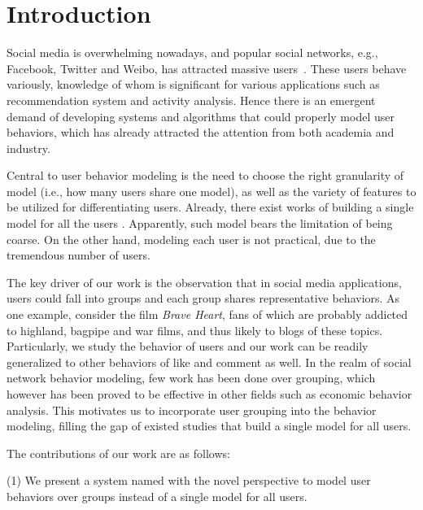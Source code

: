 \section{Introduction}
\label{sec:intro}

\par Social media is overwhelming nowadays, and popular social networks, e.g., Facebook, Twitter and Weibo, has attracted  massive users~\cite{DBLP:journals/fcsc/MaLHLH16,DBLP:journals/tkde/DuanMAMH17,DBLP:conf/icde/HuAMH16,IEEEexample:conf/wsdm/FengW13,IEEEexample:conf/ijcai/ZhangLTCL13}.
These users behave variously, knowledge of whom is significant for various applications such as recommendation system and activity analysis.
Hence there is an emergent demand of developing systems and algorithms that could properly model user behaviors, which has already attracted the attention from both academia and industry.

Central to user behavior modeling is the need to choose the right granularity of model (i.e., how many users share one model), as well as the variety of features to be utilized for differentiating users.
Already, there exist works of building a single model for all the users \cite{IEEEexample:conf/wsdm/FengW13,IEEEexample:conf/ijcai/ZhangLTCL13}.
Apparently, such model bears the limitation of being coarse.
On the other hand, modeling each user is not practical, due to the tremendous number of users.

The key driver of our work is the observation that in social media applications, users could fall into groups and each group shares representative behaviors.
%
As one example, consider the film \textit{Brave Heart}, fans of which are probably addicted to highland, bagpipe and war films, and thus likely to \ret{} blogs of these topics.
Particularly, we study the \retg{} behavior of users and our work can be readily generalized to other behaviors of like and comment as well.
In the realm of social network behavior modeling, few work has been done over grouping, which however has been proved to be effective in other fields such as economic behavior analysis.
This motivates us to incorporate user grouping into the \retg{} behavior modeling, filling the gap of existed studies that build a single model for all users.

The contributions of our work are as follows:

\stab(1) We present a system named \sys{} with the novel perspective to model user behaviors over groups instead of a single model for all users.

